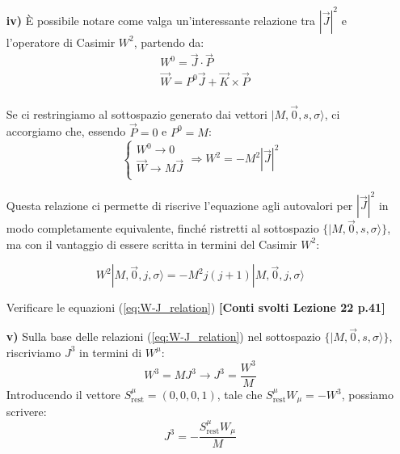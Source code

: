 \documentclass[../main.tex]{subfiles}
\begin{document}
\begin{enumerate}
    \item[\textbf{iv)}] È possibile notare come valga un'interessante relazione tra $|\Vec J|^2$ e l'operatore di Casimir $W^2$, partendo da:
    \begin{equation}
    \begin{aligned}
        &W^0 = \Vec{J}\cdot \Vec{P} \\
        &\Vec W = P^0\Vec{J} + \Vec{K}\times \Vec{P} \\
    \end{aligned}
    \label{eq:W-J_relation}
    \end{equation}

    Se ci restringiamo al sottospazio generato dai vettori \(|M,\Vec{0},s,\sigma\rangle\), ci accorgiamo che, essendo $\Vec{P}=0$ e $P^0=M$:
    \[
    \begin{cases}
        W^0 \rightarrow 0 \\
        \Vec W \rightarrow M\Vec{J} \\
    \end{cases}
    \Rightarrow \boxed{W^2 = -M^2|\Vec J|^2}
    \]

    Questa relazione ci permette di riscrive l'equazione agli autovalori per $|\Vec J|^2$ in modo completamente equivalente, finché ristretti al sottospazio \(\big\{ |M,\Vec{0},s,\sigma\rangle \big\}\), ma con il vantaggio di essere scritta in termini del Casimir $W^2$:

    \[
    \boxed{W^2|M, \Vec{0}, j, \sigma\rangle = -M^2 j(j+1)|M, \Vec{0}, j, \sigma\rangle}
    \]
    
    \begin{exercise}
        Verificare le equazioni (\ref{eq:W-J_relation}) \textbf{[Conti svolti Lezione 22 p.41]}
    \end{exercise}
    
    \item[\textbf{v)}] Sulla base delle relazioni (\ref{eq:W-J_relation}) nel sottospazio \(\big\{ |M,\Vec{0},s,\sigma\rangle \big\}\), riscriviamo $J^3$ in termini di $W^\mu$:
    \[
    W^3 = MJ^3 \rightarrow {J^3 = \frac{W^3}{M}}
    \]
    Introducendo il vettore \(S^\mu_\text{rest} = (0,0,0,1)\), tale che \(S^\mu_\text{rest}W_\mu = -W^3\), possiamo scrivere:
    \[
    \boxed{J^3 = -\frac{S^\mu_\text{rest}W_\mu}{M}}
    \]
\end{enumerate}
\end{document}

